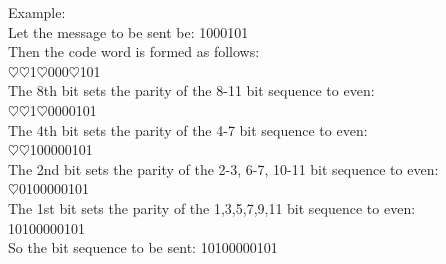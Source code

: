 \documentclass[margin=0px]{article}
\begin{document}
\begin{description}
\begin{itemize}
                  Example:\\
                  Let the message to be sent be: 1000101 \\
                  Then the code word is formed as follows: \\
                  {\color[rgb]{1,0,0}$\heartsuit\heartsuit$}1{\color[rgb]{1,0,0}$\heartsuit$}000{\color[rgb]{1,0,0}$\heartsuit$}101\\
                  The 8th bit sets the parity of the 8-11 bit sequence to even:\\
                  {\color[rgb]{1,0,0}$\heartsuit\heartsuit$}1{\color[rgb]{1,0,0}$\heartsuit$}000{\color[rgb]{0,0,1}0101}\\
                  The 4th bit sets the parity of the 4-7 bit sequence to even:\\
                  {\color[rgb]{1,0,0}$\heartsuit\heartsuit$}1{\color[rgb]{0,0,1}0000}0101\\
                  The 2nd bit sets the parity of the 2-3, 6-7, 10-11 bit sequence to even:\\
                  {\color[rgb]{1,0,0}$\heartsuit$}{\color[rgb]{0,0,1}01}00{\color[rgb]{0,0,1}00}01{\color[rgb]{0,0,1}01}\\
                  The 1st bit sets the parity of the 1,3,5,7,9,11 bit sequence to even: \\
                  {\color[rgb]{0,0,1}1}0{\color[rgb]{0,0,1}1}0{\color[rgb]{0,0,1}0}0{\color[rgb]{0,0,1}0}0{\color[rgb]{0,0,1}1}0{\color[rgb]{0,0,1}1}\\

                  So the bit sequence to be sent:
                  {\color[rgb]{1,0,0}10}1{\color[rgb]{1,0,0}0}000{\color[rgb]{1,0,0}0}101\\


\end{itemize}
\end{description}
\end{document}
